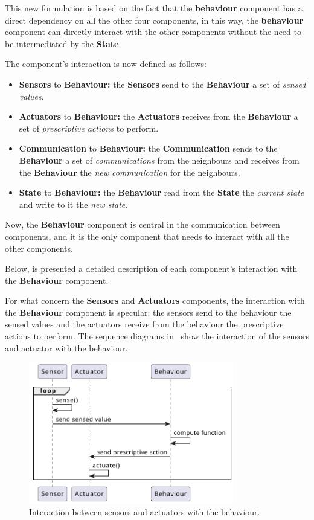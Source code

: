This new formulation is based on the fact that the \textbf{behaviour} component has a direct dependency on all the other four components,
in this way, the \textbf{behaviour} component can directly interact with the other components without the need to be intermediated by the
\textbf{State}.

The component's interaction is now defined as follows:
\begin{itemize}
	\item \textbf{Sensors} to \textbf{Behaviour:} the \textbf{Sensors} send to the \textbf{Behaviour} a set of \textit{sensed values}.
	\item \textbf{Actuators} to \textbf{Behaviour:} the \textbf{Actuators} receives from the \textbf{Behaviour} a set of \textit{prescriptive
		      actions} to perform.
	\item \textbf{Communication} to \textbf{Behaviour:} the \textbf{Communication} sends to the \textbf{Behaviour} a set of \textit{communications}
	      from the neighbours and receives from the \textbf{Behaviour} the \textit{new communication} for the neighbours.
	      \item\textbf{State} to \textbf{Behaviour:} the \textbf{Behaviour} read from the \textbf{State} the \textit{current state} and write to it
	      the \textit{new state}.
\end{itemize}

Now, the \textbf{Behaviour} component is central in the communication between components, and it is the only component that needs to interact with all the other components.

Below, is presented a detailed description of each component's interaction with the \textbf{Behaviour} component.

For what concern the \textbf{Sensors} and \textbf{Actuators} components, the interaction with the \textbf{Behaviour} component is specular: the
sensors send to the behaviour the sensed values and the actuators receive from the behaviour the prescriptive actions to perform.
The sequence diagrams in~ show the interaction of the sensors and actuator with the
behaviour.

\begin{figure}
	\centering
	\includegraphics[width=0.8\textwidth]{figures/sequence-diagram-sense-act.pdf}
	\caption{Interaction between sensors and actuators with the behaviour.}
	\label{fig:framework-components-interaction-2-sensors-actuators}
\end{figure}

